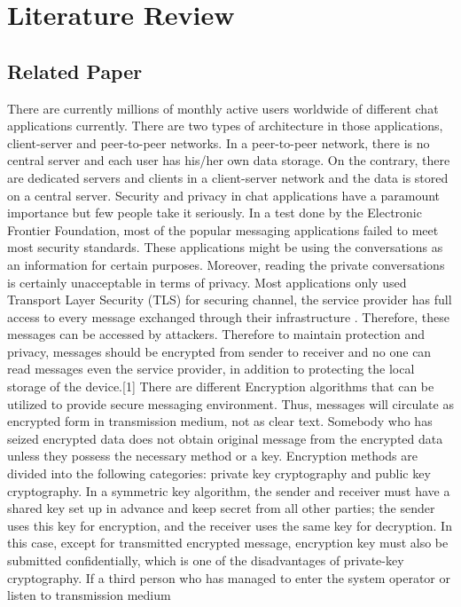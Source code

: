\chapter{Literature Review}
\section{Related Paper}
There are currently millions of monthly active users worldwide of different chat applications currently. There are two types of architecture in those applications, client-server and peer-to-peer networks. In a peer-to-peer network, there is no central server and each user has his/her own data storage. On the contrary, there are dedicated servers and clients in a client-server network and the data is stored on a central server. Security and privacy in chat applications have a paramount importance but few people take it seriously. In a test done by the Electronic Frontier Foundation, most of the popular messaging applications failed to meet most security standards. These applications might be using the conversations as an information for certain purposes. Moreover, reading the private conversations is certainly unacceptable in terms of privacy.  Most applications only used Transport Layer Security (TLS) for securing channel, the service provider has full access to every message exchanged through their infrastructure . Therefore, these messages can be accessed by attackers. Therefore to maintain protection and privacy, messages should be encrypted from sender to receiver and no one can read messages even the service provider, in addition to protecting the local storage of the device.[1]
There are different Encryption algorithms that can  be utilized  to  provide secure  messaging environment. Thus, messages will circulate as  encrypted form in transmission medium, not as clear text. Somebody who has seized encrypted data does not obtain original message from the encrypted  data  unless they  possess  the  necessary  method or  a  key.  Encryption  methods  are divided into the following categories: private key cryptography and public key cryptography.
In a symmetric key algorithm, the sender and receiver must have a shared key set up in advance and keep secret from all other parties; the sender uses this key for encryption, and the receiver uses  the  same  key  for  decryption.  In  this  case,  except  for  transmitted  encrypted  message, encryption  key  must  also  be  submitted  confidentially,  which  is  one  of  the  disadvantages of private-key cryptography.
If a third person who has managed to enter the system operator or listen to transmission medium
